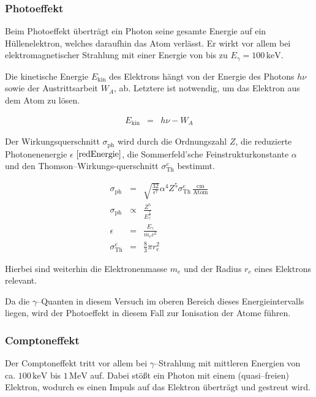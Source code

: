 \documentclass[12pt,a4paper]{scrartcl}
\numberwithin{equation}{section} %
\newcommand{\pu}[1]{\ensuremath{\mathrm{#1}}}
\begin{document}
\hypertarget{photoeffekt}{%
\subsubsection{Photoeffekt}\label{photoeffekt}}

Beim Photoeffekt überträgt ein Photon seine gesamte Energie auf ein Hüllenelektron, welches daraufhin das Atom verlässt. Er wirkt vor allem bei elektromagnetischer Strahlung mit einer Energie von bis zu $E_\gamma = \pu{100\, keV}$.

Die kinetische Energie $E_\mathrm{kin}$ des Elektrons hängt von der Energie des Photons $h\nu$ sowie der Austrittsarbeit $W_A$, ab. Letztere ist notwendig, um das Elektron aus dem Atom zu lösen.

\begin{eqnarray}
    E_\mathrm{kin} &=& h\nu - W_A
\end{eqnarray}

\noindent
Der Wirkungsquerschnitt $\sigma_\mathrm{ph}$ wird durch die Ordnungszahl $Z$, die reduzierte Photonenenergie $\epsilon$ $\eqref{redEnergie}$, die Sommerfeld'sche Feinstrukturkonstante $\alpha$ und den Thomson--\allowbreak Wirkungs-querschnitt $\sigma_\mathrm{Th}^e$ bestimmt. \cite{Bethge}

\begin{eqnarray}
    \sigma_\mathrm{ph}
        &=& \sqrt{\frac{32}{\epsilon^7}}\alpha^4 Z^5
            \sigma_\mathrm{Th}^e \pu{\,\frac{cm}{Atom}} \\
    \sigma_\mathrm{ph}
        &\propto& \frac{Z^5}{E_\gamma^{\frac{7}{2}}} \\
    \epsilon &=& \frac{E_\gamma}{m_ec^2} \label{redEnergie} \\
    \sigma_\mathrm{Th}^e &=& \frac{8}{3} \pi r_e^2
\end{eqnarray}

\noindent
Hierbei sind weiterhin die Elektronenmasse $m_e$ und der Radius $r_e$ eines Elektrons relevant.

Da die $\gamma$--Quanten in diesem Versuch im oberen Bereich dieses Energieintervalls liegen, wird der Photoeffekt in diesem Fall zur Ionisation der Atome führen.

\hypertarget{comptoneffekt}{%
\subsubsection{Comptoneffekt}\label{comptoneffekt}}

Der Comptoneffekt tritt vor allem bei $\gamma$--Strahlung mit mittleren Energien von ca. $\pu{100\, keV}$ bis $\pu{1\, MeV}$ auf. Dabei stößt ein Photon mit einem (quasi--freien) Elektron, wodurch es einen Impuls auf das Elektron überträgt und gestreut wird.
\end{document}
